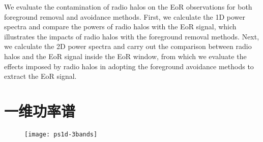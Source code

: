 We evaluate the contamination of radio halos on the EoR observations for
both foreground removal and avoidance methods.
First, we calculate the 1D power spectra and compare the powers of
radio halos with the EoR signal, which illustrates the impacts of radio
halos with the foreground removal methods.
Next, we calculate the 2D power spectra and carry out the comparison
between radio halos and the EoR signal inside the EoR window, from
which we evaluate the effects imposed by radio halos in adopting the
foreground avoidance methods to extract the EoR signal.


\section{一维功率谱}
\label{sec:ps1d}

\begin{figure}[htp]
  \centering
  \texttt{[image: ps1d-3bands]}
  \label{fig:ps1d-3bands}
\end{figure}

